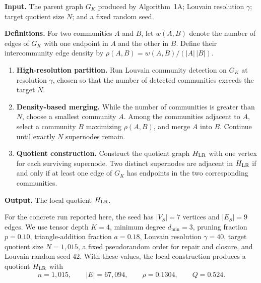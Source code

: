 \documentclass[12pt]{article}
\begin{document}
\begin{tcolorbox}[
breakable, colback=white, colframe=black, boxrule=0.5pt, arc=0pt,
left=6pt, right=6pt, top=6pt, bottom=6pt,
title={Algorithm 1B: Coarsening to the quotient}
]
\small

\textbf{Input.}
The parent graph \(G_K\) produced by Algorithm~1A; Louvain resolution
\(\gamma\); target quotient size \(N\); and a fixed random seed.

\medskip
\textbf{Definitions.}
For two communities \(A\) and \(B\), let \(w(A,B)\) denote the number of
edges of \(G_K\) with one endpoint in \(A\) and the other in \(B\).  Define
their intercommunity edge density by
\(\rho(A,B) = w(A,B)/(|A|\,|B|)\).

\medskip
\begin{enumerate}

\item \textbf{High-resolution partition.}
Run Louvain community detection on \(G_K\) at resolution \(\gamma\), chosen
so that the number of detected communities exceeds the target \(N\).

\item \textbf{Density-based merging.}
While the number of communities is greater than \(N\), choose a smallest
community \(A\).  Among the communities adjacent to \(A\), select a
community \(B\) maximizing \(\rho(A,B)\), and merge \(A\) into \(B\).
Continue until exactly \(N\) supernodes remain.

\item \textbf{Quotient construction.}
Construct the quotient graph \(H_{\rm LR}\) with one vertex for each
surviving supernode.  Two distinct supernodes are adjacent in
\(H_{\rm LR}\) if and only if at least one edge of \(G_K\) has endpoints in
the two corresponding communities.

\end{enumerate}

\medskip
\textbf{Output.}
The local quotient \(H_{\rm LR}\).

\end{tcolorbox}

For the concrete run reported here, the seed has \(|V_S|=7\) vertices and
\(|E_S|=9\) edges.  We use tensor depth \(K=4\), minimum degree
\(d_{\min}=3\), pruning fraction \(p=0.10\), triangle-addition fraction
\(a=0.18\), Louvain resolution \(\gamma=40\), target quotient size
\(N=1{,}015\), a fixed pseudorandom order for repair and closure, and
Louvain random seed \(42\).  With these values, the local
construction produces a quotient \(H_{\rm LR}\) with
\[
n=1{,}015,\qquad |E|=67{,}094,\qquad \rho=0.1304,\qquad Q=0.524.
\]
\end{document}

